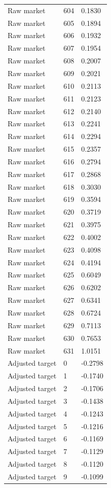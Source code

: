 \begin{table}[htbp]
\begin{tabular}{lll}
Raw market & 604 & 0.1830 \\
Raw market & 605 & 0.1894 \\
Raw market & 606 & 0.1932 \\
Raw market & 607 & 0.1954 \\
Raw market & 608 & 0.2007 \\
Raw market & 609 & 0.2021 \\
Raw market & 610 & 0.2113 \\
Raw market & 611 & 0.2123 \\
Raw market & 612 & 0.2140 \\
Raw market & 613 & 0.2241 \\
Raw market & 614 & 0.2294 \\
Raw market & 615 & 0.2357 \\
Raw market & 616 & 0.2794 \\
Raw market & 617 & 0.2868 \\
Raw market & 618 & 0.3030 \\
Raw market & 619 & 0.3594 \\
Raw market & 620 & 0.3719 \\
Raw market & 621 & 0.3975 \\
Raw market & 622 & 0.4002 \\
Raw market & 623 & 0.4098 \\
Raw market & 624 & 0.4194 \\
Raw market & 625 & 0.6049 \\
Raw market & 626 & 0.6202 \\
Raw market & 627 & 0.6341 \\
Raw market & 628 & 0.6724 \\
Raw market & 629 & 0.7113 \\
Raw market & 630 & 0.7653 \\
Raw market & 631 & 1.0151 \\
Adjusted target & 0 & -0.2798 \\
Adjusted target & 1 & -0.1740 \\
Adjusted target & 2 & -0.1706 \\
Adjusted target & 3 & -0.1438 \\
Adjusted target & 4 & -0.1243 \\
Adjusted target & 5 & -0.1216 \\
Adjusted target & 6 & -0.1169 \\
Adjusted target & 7 & -0.1129 \\
Adjusted target & 8 & -0.1120 \\
Adjusted target & 9 & -0.1099 \\

\end{tabular}
\end{table}
